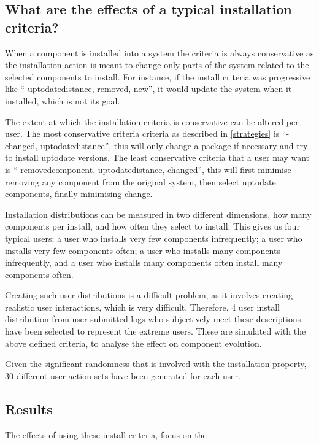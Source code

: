 \subsection{What are the effects of a typical installation criteria?}
When a component is installed into a system the criteria is always conservative as the installation action is meant to change only parts of the system related to the selected components to install.
For instance, if the install criteria was progressive like ``-uptodatedistance,-removed,-new'', it would update the system when it installed, which is not its goal.

The extent at which the installation criteria is conservative can be altered per user.
The most conservative criteria criteria as described in \ref{strategies}  is ``-changed,-uptodatedistance'', this will only change a package if necessary and try to install uptodate versions.
The least conservative criteria that a user may want is ``-removedcomponent,-uptodatedistance,-changed'', this will first minimise removing any component from the original system,
then select uptodate components, finally minimising change.

Installation distributions can be measured in two different dimensions, how many components per install, and how often they select to install.
This gives us four typical users; a user who installs very few components infrequently; 
a user who installs very few components often;
a user who installs many components infrequently,
and a user who installs many components often install many components often.

Creating such user distributions is a difficult problem, as it involves creating realistic user interactions, which is very difficult.
Therefore, 4 user install distribution from user submitted logs who subjectively meet these descriptions have been selected to represent the extreme users.
These are simulated with the above defined criteria, to analyse the effect on component evolution.

Given the significant randomness that is involved with the installation property, 30 different user action sets have been generated for each user.


\subsection{Results}
The effects of using these install criteria, focus on the 

